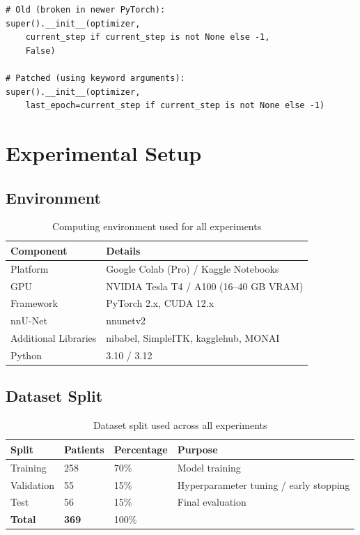\documentclass[12pt,a4paper]{report}
\begin{document}
\begin{lstlisting}[caption={PolyLR compatibility patch for newer PyTorch versions}]
# Old (broken in newer PyTorch):
super().__init__(optimizer,
    current_step if current_step is not None else -1,
    False)

# Patched (using keyword arguments):
super().__init__(optimizer,
    last_epoch=current_step if current_step is not None else -1)
\end{lstlisting}

\chapter{Experimental Setup}

\section{Environment}

\begin{table}[H]
\centering
\caption{Computing environment used for all experiments}
\label{tab:env}
\begin{tabular}{ll}
\toprule
\textbf{Component} & \textbf{Details} \\
\midrule
Platform & Google Colab (Pro) / Kaggle Notebooks \\
GPU & NVIDIA Tesla T4 / A100 (16--40 GB VRAM) \\
Framework & PyTorch 2.x, CUDA 12.x \\
nnU-Net & nnunetv2 \\
Additional Libraries & nibabel, SimpleITK, kagglehub, MONAI \\
Python & 3.10 / 3.12 \\
\bottomrule
\end{tabular}
\end{table}

\section{Dataset Split}

\begin{table}[H]
\centering
\caption{Dataset split used across all experiments}
\label{tab:split}
\begin{tabular}{llll}
\toprule
\textbf{Split} & \textbf{Patients} & \textbf{Percentage} & \textbf{Purpose} \\
\midrule
Training & 258 & 70\% & Model training \\
Validation & 55 & 15\% & Hyperparameter tuning / early stopping \\
Test & 56 & 15\% & Final evaluation \\
\textbf{Total} & \textbf{369} & 100\% & \\
\bottomrule
\end{tabular}
\end{table}
\end{document}
